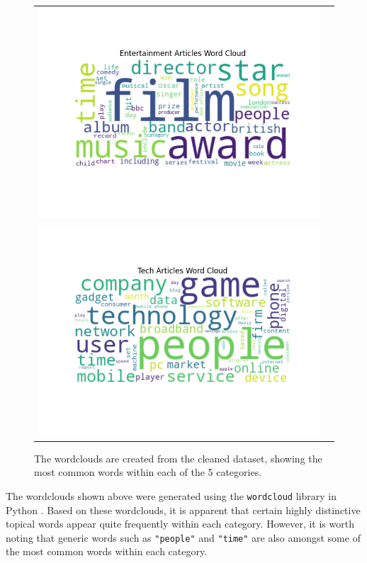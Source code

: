 \documentclass[12pt]{article}
\begin{document}
\begin{figure}[H]
\begin{tabular}{cc}
    \includegraphics[scale=0.50]{plots/entertainment_wordcloud.png} \\
    \includegraphics[scale=0.50]{plots/tech_wordcloud.png}          \\
  \end{tabular}
  \caption{The wordclouds are created from the cleaned dataset, showing the most common words within each of the 5 categories.}
\end{figure}

The wordclouds shown above were generated using the \texttt{wordcloud} library in Python \parencite{oesper2011wordcloud}. Based on these wordclouds, it is apparent that certain highly distinctive topical words appear quite frequently within each category. However, it is worth noting that generic words such as \texttt{"people"} and \texttt{"time"} are also amongst some of the most common words within each category.
\end{document}
